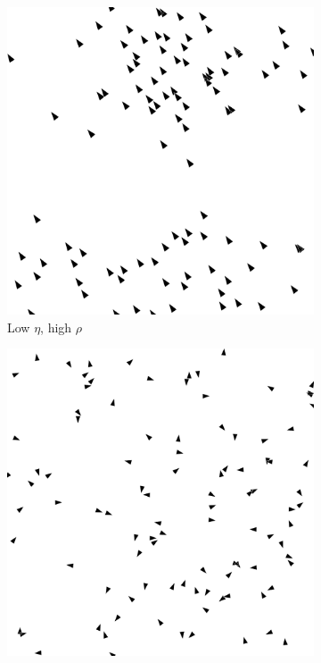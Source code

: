 \documentclass[twoside,twocolumn]{article}
\begin{document}
\begin{figure}[!htb]
\begin{subfigure}[b]{0.45\columnwidth}
            \includegraphics[width=\columnwidth]{low-eta-high-rho}
            \caption{Low $\eta$, high $\rho$}
        \end{subfigure}
        \begin{subfigure}[b]{0.45\columnwidth}
	    \includegraphics[width=\columnwidth]{high-eta-low-rho}

\end{subfigure}
\end{figure}
\end{document}
